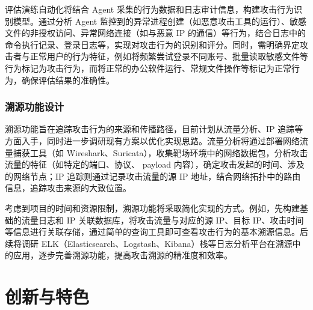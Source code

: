 \documentclass[lang=cn,10pt]{elegantbook}
\begin{document}
评估演练自动化将结合 Agent 采集的行为数据和日志审计信息，构建攻击行为识别模型。通过分析 Agent 监控到的异常进程创建（如恶意攻击工具的运行）、敏感文件的非授权访问、异常网络连接（如与恶意 IP 的通信）等行为，结合日志中的命令执行记录、登录日志等，实现对攻击行为的识别和评分。同时，需明确界定攻击者与正常用户的行为特征，例如将频繁尝试登录不同账号、批量读取敏感文件等行为标记为攻击行为，而将正常的办公软件运行、常规文件操作等标记为正常行为，确保评估结果的准确性。

\subsection{溯源功能设计}
溯源功能旨在追踪攻击行为的来源和传播路径，目前计划从流量分析、IP 追踪等方面入手，同时进一步调研现有方案以优化实现思路。流量分析将通过部署网络流量捕获工具（如 Wireshark、Suricata），收集靶场环境中的网络数据包，分析攻击流量的特征（如特定的端口、协议、 payload 内容），确定攻击发起的时间、涉及的网络节点；IP 追踪则通过记录攻击流量的源 IP 地址，结合网络拓扑中的路由信息，追踪攻击来源的大致位置。​

考虑到项目的时间和资源限制，溯源功能将采取简化实现的方式。例如，先构建基础的流量日志和 IP 关联数据库，将攻击流量与对应的源 IP、目标 IP、攻击时间等信息进行关联存储，通过简单的查询工具即可查看攻击行为的基本溯源信息。后续将调研 ELK（Elasticsearch、Logstash、Kibana）栈等日志分析平台在溯源中的应用，逐步完善溯源功能，提高攻击溯源的精准度和效率。

\chapter{创新与特色}
\end{document}
